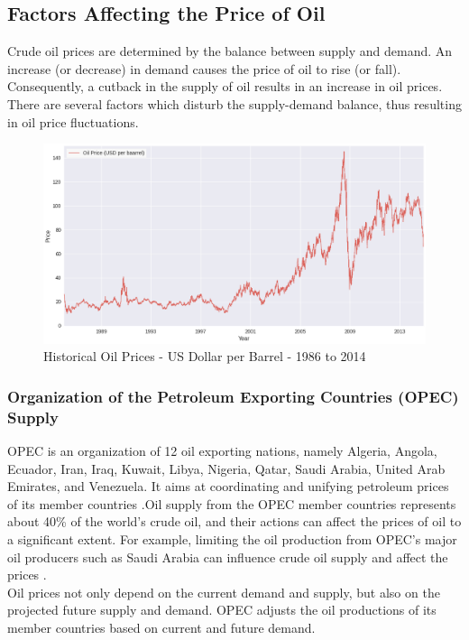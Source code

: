 \documentclass[runningheads]{llncs}
\begin{document}
\subsection{Factors Affecting the Price of Oil}
Crude oil prices are determined by the balance between supply and demand. An increase (or decrease) in demand causes the price of oil to rise (or fall). Consequently, a cutback in the supply of oil results in an increase in oil prices. There are several factors which disturb the supply-demand balance, thus resulting in oil price fluctuations. 


\begin{figure}
\centering
\includegraphics[width=\textwidth]{Oil_since1970.png}
\caption{Historical Oil Prices - US Dollar per Barrel - 1986 to 2014}
\label{fig:Oil_since1970.png}
\end{figure}

\subsubsection{Organization of the Petroleum Exporting Countries (OPEC) Supply}
OPEC is an organization of 12 oil exporting nations, namely Algeria, Angola, Ecuador, Iran, Iraq, Kuwait, Libya, Nigeria, Qatar, Saudi Arabia, United Arab Emirates, and Venezuela. It aims at coordinating and unifying petroleum prices of its member countries \cite{opec}.Oil supply from the OPEC member countries represents about 40\% of the world’s crude oil, and their actions can affect the prices of oil to a significant extent. For example, limiting the oil production from OPEC’s major oil producers such as Saudi Arabia can influence crude oil supply and affect the prices \cite{eiafactors}.\\ 
\noindent Oil prices not only depend on the current demand and supply, but also on the projected future supply and demand. OPEC adjusts the oil productions of its member countries based on current and future demand.
\end{document}

